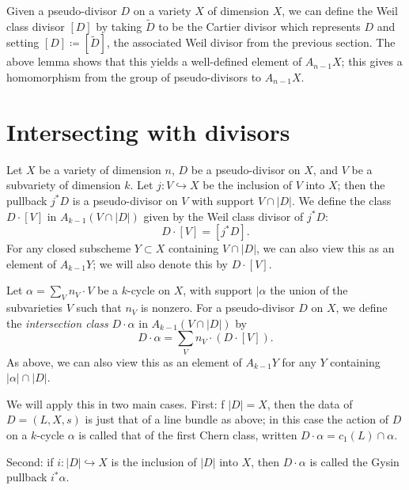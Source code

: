 \documentclass[leqno, openany]{memoir}
\theoremstyle{definition}
\theoremstyle{remark}
\theoremstyle{plain}
\theoremstyle{definition}
\theoremstyle{remark}
\begin{document}
Given a pseudo-divisor $D$ on a variety $X$ of dimension $X$, we can define the Weil class divisor $[D]$ by taking $\tilde D$ to be the Cartier divisor which represents $D$ and setting $[D] \coloneqq [\tilde D]$, the associated Weil divisor from the previous section. The above lemma shows that this yields a well-defined element of $A_{n-1} X$; this gives a homomorphism from the group of pseudo-divisors to $A_{n-1} X$.

\section{Intersecting with divisors}
Let $X$ be a variety of dimension $n$, $D$ be a pseudo-divisor on $X$, and $V$ be a subvariety of dimension $k$. Let $j\colon V \hookrightarrow X$ be the inclusion of $V$ into $X$; then the pullback $j^* D$ is a pseudo-divisor on $V$ with support $V \cap |D|$. We define the class $D \cdot [V]$ in $A_{k-1} (V \cap |D|)$ given by the Weil class divisor of $j^* D$: \[ D \cdot [V] = [j^* D] . \] For any closed subscheme $Y \subset X$ containing $V \cap |D|$, we can also view this as an element of $A_{k-1} Y$; we will also denote this by $D \cdot [V]$.

Let $\alpha = \sum_V n_V \cdot V$ be a $k$-cycle on $X$, with support $|\alpha$ the union of the subvarieties $V$ such that $n_V$ is nonzero. For a pseudo-divisor $D$ on $X$, we define the \textit{intersection class} $D \cdot \alpha$ in $A_{k-1}(V \cap |D|)$ by \[ D \cdot \alpha = \sum_V n_V \cdot (D \cdot [V]) . \] As above, we can also view this as an element of $A_{k-1} Y$ for any $Y$ containing $|\alpha| \cap |D|$.

We will apply this in two main cases. First: f $|D| = X$, then the data of $D = (L, X, s)$ is just that of a line bundle as above; in this case the action of $D$ on a $k$-cycle $\alpha$ is called that of the first Chern class, written $D \cdot \alpha = c_1(L) \cap \alpha$.

Second: if $i\colon |D| \hookrightarrow X$ is the inclusion of $|D|$ into $X$, then $D \cdot \alpha$ is called the Gysin pullback $i^* \alpha$.
\end{document}
